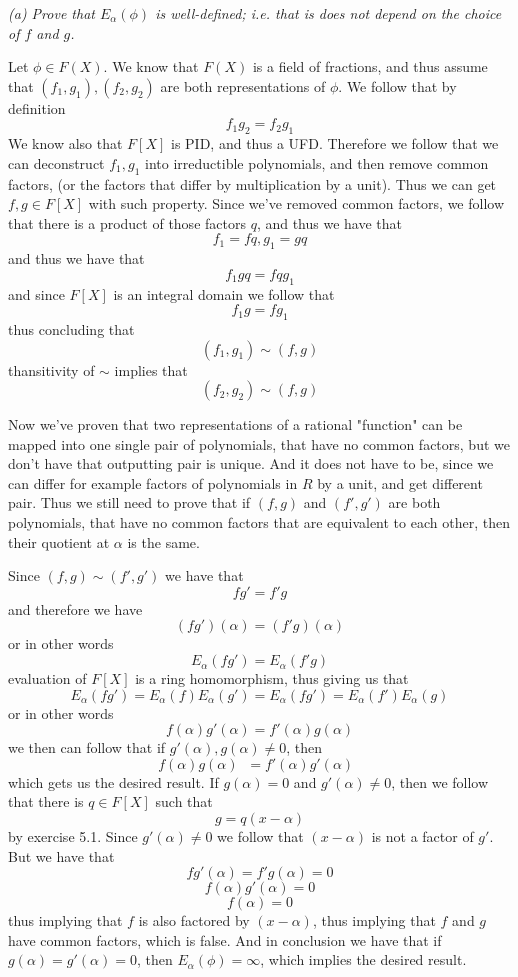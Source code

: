 \documentclass[11pt,oneside,titlepage]{book}
\DeclareMathOperator \inv {^{-1}}
\begin{document}
\textit{(a) Prove that $E_\alpha(\phi)$ is well-defined; i.e. that is
  does not depend on the choice of $f$ and $g$.}

Let $\phi \in F(X)$. We know that $F(X)$ is a field of fractions, and
thus assume that $(f_1, g_1), (f_2, g_2)$ are both representations of
$\phi$. We follow that by definition
$$f_1 g_2 = f_2 g_1$$
We know also that $F[X]$ is PID, and thus a UFD. Therefore we follow
that we can deconstruct $f_1, g_1$ into irreductible polynomials, and
then remove common factors, (or the factors that differ by multiplication
by a unit). Thus we can get $f, g \in F[X]$ with such property.
Since we've removed common factors, we follow that there is a
product of those factors $q$, and thus we have that
$$f_1 = fq, g_1 = gq$$
and thus we have that
$$f_1 gq = fq g_1$$
and since $F[X]$ is an integral domain we follow that
$$f_1 g = f g_1$$
thus concluding that
$$(f_1, g_1) \sim (f, g)$$
thansitivity of $\sim$ implies that
$$(f_2, g_2) \sim (f, g)$$

Now we've proven that two representations of a rational "function" can
be mapped into one single pair of polynomials, that have no common
factors, but we don't have that outputting pair is unique. And it does
not have to be, since we can differ for example factors of polynomials
in $R$ by a unit, and get different pair. Thus we still need to prove
that if $(f, g)$ and $(f', g')$ are both polynomials, that have
no common factors that are equivalent to each other, then their
quotient at $\alpha$ is the same.

Since $(f, g) \sim (f', g')$ we have that
$$fg' = f'g$$
and therefore we have
$$(fg')(\alpha) = (f'g)(\alpha)$$
or in other words
$$E_\alpha(f g') = E_\alpha(f' g)$$
evaluation of $F[X]$ is a ring homomorphism, thus giving us that
$$E_\alpha(f g') = E_\alpha(f) E_\alpha(g')  = E_\alpha(f g') = E_\alpha(f') E_\alpha(g)$$
or in other words
$$f(\alpha) g'(\alpha) = f'(\alpha) g(\alpha)$$
we then can follow that if $g'(\alpha), g(\alpha) \neq 0$, then
$$f(\alpha) g(\alpha)\inv = f'(\alpha) g'(\alpha) \inv$$
which gets us the desired result.
If $g(\alpha) = 0$ and $g'(\alpha) \neq 0$, then we follow that
there is $q \in F[X]$ such that
$$g = q(x - \alpha)$$
by exercise 5.1. Since $g'(\alpha) \neq 0$ we follow that $(x - \alpha)$ is
not a factor of $g'$. But we have that
$$fg'(\alpha) = f'g(\alpha) = 0$$
$$f(\alpha) g'(\alpha) = 0$$
$$f(\alpha) = 0$$
thus implying that $f$ is also factored by $(x - \alpha)$, thus implying that
$f$ and $g$ have common factors, which is false.
And in conclusion we have that if $g(\alpha) = g'(\alpha) = 0$, then
$E_\alpha(\phi) = \infty$, which implies the desired result.
\end{document}
